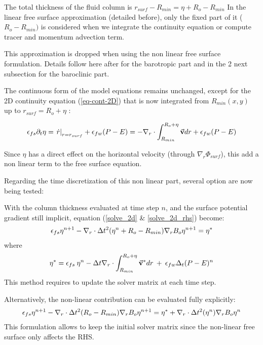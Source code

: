 The total thickness of the fluid column is
$r_{surf} - R_{min} = \eta + R_o - R_{min}$
In the linear free surface approximation
(detailed before), only the fixed part of
it ($R_o - R_{min})$ is considered when we integrate the 
continuity equation or compute tracer and momentum advection term.

This approximation is dropped when using 
the non linear free surface formulation. 
Details follow here after for the barotropic part
and in the 2 next subsection for the baroclinic
part.


The continuous form of the model equations remains 
unchanged, except for the 2D continuity equation
(\ref{eq-cont-2D}) that is now integrated 
from $R_{min}(x,y)$ up to $r_{surf}=R_o+\eta$ :

\begin{displaymath}
\epsilon_{fs} \partial_t \eta =
\left. \dot{r} \right|_{r=r_{surf}} + \epsilon_{fw} (P-E) =
- {\bf \nabla}_r \cdot \int_{R_{min}}^{R_o+\eta} \vec{\bf v} dr
+ \epsilon_{fw} (P-E)
\end{displaymath}

Since $\eta$ has a direct effect on the horizontal
velocity (through $\nabla_r \Phi_{surf}$), this
add a non linear term to the free surface equation.

Regarding the time discretization of this non linear part,
several option are now being tested:

With the column thickness evaluated at time step $n$,
and the surface potential gradient still implicit,
equation (\ref{solve_2d} \& \ref{solve_2d_rhs})
become:
\begin{eqnarray*}
\epsilon_{fs} {\eta}^{n+1} -
{\bf \nabla}_r \cdot \Delta t^2 (\eta^{n}+R_o-R_{min})
{\bf \nabla}_r B_o {\eta}^{n+1}
= {\eta}^*
\end{eqnarray*}
where
\begin{eqnarray*}
{\eta}^* = \epsilon_{fs} \: {\eta}^{n} -
\Delta t {\bf \nabla}_r \cdot \int_{R_{min}}^{R_o+\eta} \vec{\bf v}^* dr
\: + \: \epsilon_{fw} \Delta_t (P-E)^{n}
\end{eqnarray*} 
This method requires to update the solver matrix at each time step.

Alternatively, the non-linear contribution can be evaluated fully
explicitly:
\begin{eqnarray*}
\epsilon_{fs} {\eta}^{n+1} -
{\bf \nabla}_r \cdot \Delta t^2 (R_o-R_{min})
{\bf \nabla}_r B_o {\eta}^{n+1}
= {\eta}^*
+{\bf \nabla}_r \cdot \Delta t^2 (\eta^{n})
{\bf \nabla}_r B_o {\eta}^{n}
\end{eqnarray*} 
This formulation allows to keep the initial solver matrix
since the non-linear free surface only affects the RHS.

